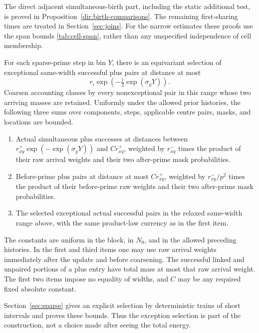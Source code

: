 The direct adjacent simultaneous-birth part, including the static additional
test, is proved in Proposition~\ref{dir:birth-comparisons}.  The
remaining first-sharing times are treated in
Section~\ref{sec:joins}.  For the narrow estimates these proofs use
the span bounds \eqref{tab:cell-span}, rather than any unspecified
independence of cell membership.

\begin{proposition}
\label{tab:sparse-input}
For each sparse-prime step in bin $Y$, there is an equivariant
selection of exceptional same-width successful plus pairs at
distance at most
\[
 r_i\exp\left(-\tfrac12\exp(\sigma_gY)\right).
\]
Coarsen accounting classes by every nonexceptional pair in this
range whose two arriving masses are retained.  Uniformly under the
allowed prior histories, the following three sums over components,
steps, applicable centre pairs, masks, and locations are bounded.
\begin{enumerate}
\item Actual simultaneous plus successes at distances between
$r_{xy}^+\exp(-\exp(\sigma_gY))$ and $Cr_{xy}^+$, weighted by
$r_{xy}^-$ times the product of their raw arrival weights and their
two after-prime mask probabilities.
\item Before-prime plus pairs at distance at most $Cr_{xy}^+$,
weighted by $r_{xy}^-/p^2$ times the product of their before-prime
raw weights and their two after-prime mask probabilities.
\item The selected exceptional actual successful pairs in the
relaxed same-width range above, with the same product-law currency
as in the first item.
\end{enumerate}
The constants are uniform in the block, in $N_0$, and in the
allowed preceding histories.  In the first and third items one may
use raw arrival weights immediately after the update and before
coarsening.  The successful linked and unpaired portions of a plus
entry have total mass at most that raw arrival weight.  The first
two items impose no equality of widths, and $C$ may be any required
fixed absolute constant.
\end{proposition}

Section~\ref{sec:sparse} gives an explicit selection by deterministic
trains of short intervals and proves these bounds.  Thus the
exception selection is part of the construction, not a choice made
after seeing the total energy.

